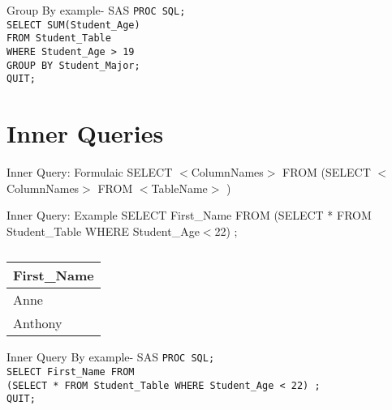 \documentclass{beamer}
\begin{document}
	\begin{frame}{Group By example- SAS}
		\texttt{PROC SQL;} \\
		\texttt{SELECT SUM(Student\_Age) } \\
		\texttt{FROM Student\_Table}\\
		\texttt{WHERE Student\_Age > 19  } \\
		\texttt{GROUP BY Student\_Major;} \\
		\texttt{QUIT;}
	\end{frame}
	\section{Inner Queries}
	\begin{frame}
		\begin{block}{Inner Query: Formulaic}
			SELECT $<$ColumnNames$>$ FROM (SELECT $<$ColumnNames$>$ FROM $<$TableName$>$ )
		\end{block}
		\begin{block}{Inner Query: Example}
			SELECT First\_Name FROM (SELECT * FROM Student\_Table WHERE Student\_Age$<$22) ;
		\end{block}		
	\begin{table}[H]
	\centering
	\caption*{}

	\begin{tabular}{|l|}
		\hline
		First\_Name  \\ \hline
		Anne  \\ \hline
		Anthony  \\    \hline
	\end{tabular}
	\end{table}				
	\end{frame}
	
	\begin{frame}{Inner Query By example- SAS}
		\texttt{PROC SQL;} \\
		\texttt{SELECT First\_Name FROM } \\
		\texttt{(SELECT * FROM Student\_Table WHERE Student\_Age < 22) ;}\\
		\texttt{QUIT;}
	\end{frame}	
	
	
	
\end{document}
